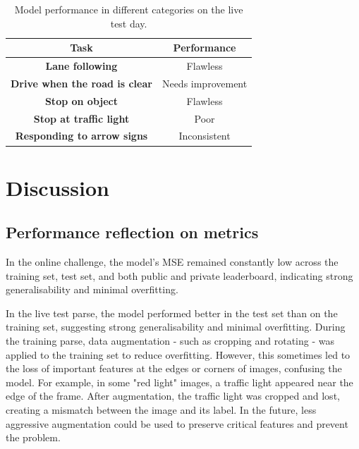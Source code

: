 \documentclass{article}
\begin{document}
\begin{table}[h]
  \centering
  \renewcommand{\arraystretch}{1.3}
  \begin{tabular}{|c|c|}
    \hline
    \textbf{Task}                         & \textbf{Performance} \\
    \hline
    \textbf{Lane following}               & Flawless             \\
    \hline
    \textbf{Drive when the road is clear} & Needs improvement    \\
    \hline
    \textbf{Stop on object}               & Flawless             \\
    \hline
    \textbf{Stop at traffic light}        & Poor                 \\
    \hline
    \textbf{Responding to arrow signs}    & Inconsistent         \\
    \hline
  \end{tabular}
  \vspace{0.5em}
  \caption{Model performance in different categories on the live test day.}
  \label{tab:live_test_day_performance}
\end{table}


\section{Discussion}

\subsection{Performance reflection on metrics}
\label{sec:performance_reflection_on_metrics}
In the online challenge, the model's MSE remained constantly low across the training set, test set, and both public and private leaderboard, indicating strong generalisability and minimal overfitting.

In the live test parse, the model performed better in the test set than on the training set, suggesting strong generalisability and minimal overfitting. During the training parse, data augmentation - such as cropping and rotating - was applied to the training set to reduce overfitting. However, this sometimes led to the loss of important features at the edges or corners of images, confusing the model. For example, in some "red light" images, a traffic light appeared near the edge of the frame. After augmentation, the traffic light was cropped and lost, creating a mismatch between the image and its label. In the future, less aggressive augmentation could be used to preserve critical features and prevent the problem.
\end{document}
